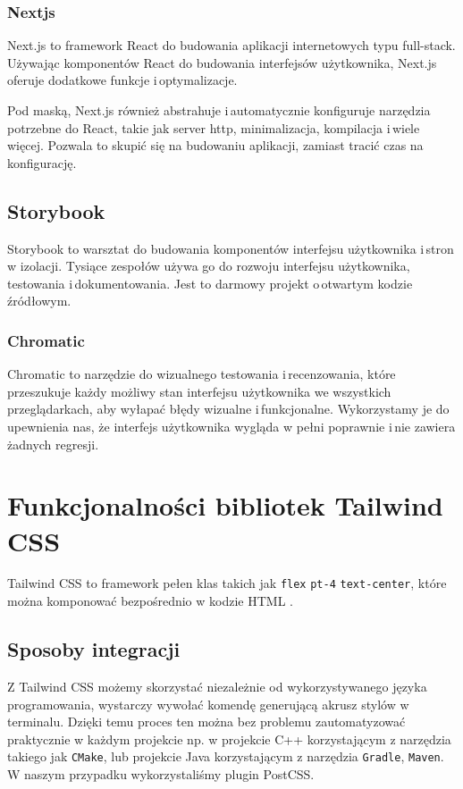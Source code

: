 \documentclass[a4paper,12pt]{book} %
\begin{document}
\subsection{Nextjs}
Next.js to framework React do budowania aplikacji internetowych typu full-stack. Używając komponentów React do budowania interfejsów użytkownika, Next.js oferuje dodatkowe funkcje i\,optymalizacje.

Pod maską, Next.js również abstrahuje i\,automatycznie konfiguruje narzędzia potrzebne do React, takie jak server http, minimalizacja, kompilacja i\,wiele więcej. Pozwala to skupić się na budowaniu aplikacji, zamiast tracić czas na konfigurację.

\section{Storybook}
Storybook to warsztat do budowania komponentów interfejsu użytkownika i\,stron w izolacji. Tysiące zespołów używa go do rozwoju interfejsu użytkownika, testowania i\,dokumentowania. Jest to darmowy projekt o\,otwartym kodzie źródłowym.

\subsection{Chromatic}
Chromatic to narzędzie do wizualnego testowania i\,recenzowania, które przeszukuje każdy możliwy stan interfejsu użytkownika we wszystkich przeglądarkach, aby wyłapać błędy wizualne i\,funkcjonalne. Wykorzystamy je do upewnienia nas, że interfejs użytkownika wygląda w pełni poprawnie i\,nie zawiera żadnych regresji.






\chapter{Funkcjonalności bibliotek Tailwind CSS}
Tailwind CSS to framework pełen klas takich jak \lstinline|flex| \lstinline|pt-4| \lstinline|text-center|, które można komponować bezpośrednio w kodzie HTML \cite{TailwindCSS}.

\section{Sposoby integracji}
Z Tailwind CSS możemy skorzystać niezależnie od wykorzystywanego języka programowania, wystarczy wywołać komendę generującą akrusz stylów w terminalu. Dzięki temu proces ten można bez problemu zautomatyzować praktycznie w każdym projekcie np. w projekcie C++ korzystającym z narzędzia takiego jak \lstinline|CMake|, lub projekcie Java korzystającym z narzędzia \lstinline|Gradle|, \lstinline|Maven|. W naszym przypadku wykorzystaliśmy plugin PostCSS.
\end{document}
